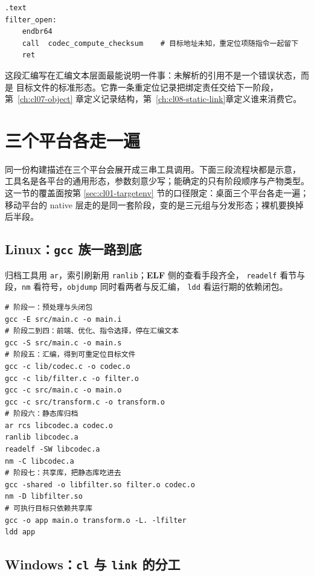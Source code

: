 \documentclass[12pt,a4paper,fontset=fandol]{ctexbook}
\newcommand{\Tool}[1]{\texttt{#1}}
\newcommand{\Elf}{\textbf{\textsf{ELF}}}
\newcommand{\Nix}{\textsf{Linux}}
\newcommand{\Win}{\textsf{Windows}}
\begin{document}
\begin{lstlisting}[style=asmstyle, caption={链接前的调用点仍保留外部名字，链接后同一位置是相对偏移或表项（示意，非本仓库实测值）}]
    .text
filter_open:
    endbr64
    call  codec_compute_checksum    # 目标地址未知，重定位项随指令一起留下
    ret
\end{lstlisting}

这段汇编写在汇编文本层面最能说明一件事：未解析的引用不是一个错误状态，而是
目标文件的标准形态。它靠一条重定位记录把绑定责任交给下一阶段，第~\ref{ch:cl07-object}
章定义记录结构，第~\ref{ch:cl08-static-link}章定义谁来消费它。

\section{三个平台各走一遍}\label{sec:cl15-platform}

同一份构建描述在三个平台会展开成三串工具调用。下面三段流程块都是示意，
工具名是各平台的通用形态，参数刻意少写；能确定的只有阶段顺序与产物类型。
这一节的覆盖面按第 \ref{sec:cl01-targetenv} 节的口径限定：桌面三个平台各走一遍；
移动平台的 native 层走的是同一套阶段，变的是三元组与分发形态；裸机要换掉后半段。

\subsection{\Nix{}：\Tool{gcc} 族一路到底}\label{sec:cl15-nix}

归档工具用 \Tool{ar}，索引刷新用 \Tool{ranlib}；\Elf{} 侧的查看手段齐全，
\Tool{readelf} 看节与段，\Tool{nm} 看符号，\Tool{objdump} 同时看两者与反汇编，
\Tool{ldd} 看运行期的依赖闭包。

\begin{lstlisting}[style=shellstyle, caption={\Nix{} 走法：把每个中间产物都留在磁盘上（示意流程）}]
# 阶段一：预处理与头闭包
gcc -E src/main.c -o main.i
# 阶段二到四：前端、优化、指令选择，停在汇编文本
gcc -S src/main.c -o main.s
# 阶段五：汇编，得到可重定位目标文件
gcc -c lib/codec.c -o codec.o
gcc -c lib/filter.c -o filter.o
gcc -c src/main.c -o main.o
gcc -c src/transform.c -o transform.o
# 阶段六：静态库归档
ar rcs libcodec.a codec.o
ranlib libcodec.a
readelf -SW libcodec.a
nm -C libcodec.a
# 阶段七：共享库，把静态库吃进去
gcc -shared -o libfilter.so filter.o codec.o
nm -D libfilter.so
# 可执行目标只依赖共享库
gcc -o app main.o transform.o -L. -lfilter
ldd app
\end{lstlisting}

\subsection{\Win{}：\Tool{cl} 与 \Tool{link} 的分工}\label{sec:cl15-win}
\end{document}
